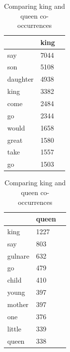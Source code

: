 \documentclass[11pt]{article}
\begin{document}
\begin{table}[H]
\centering
\begin{tabular}{@{}lll@{}}
\toprule
                    &           king        \\ \midrule
say                 &           7044        \\
son                 &           5108        \\
daughter            &           4938        \\ 
king                &           3382        \\
come                &           2484        \\
go                  &           2344        \\
would               &           1658        \\
great               &           1580        \\
take                &           1557        \\            
go                  &           1503        \\ \bottomrule
           
\end{tabular}
\hspace*{0.5cm}
\begin{tabular}{@{}lll@{}}
\toprule

                    &       queen   \\ \midrule
king                &       1227    \\
say                 &       803     \\
gulnare             &       632     \\ 
go                  &       479     \\
child               &       410     \\
young               &       397     \\
mother              &       397     \\
one                 &       376     \\
little              &       339     \\            
queen               &       338     \\ \bottomrule
\end{tabular}

\caption{Comparing king and queen co-occurrences}
\label{king/queen}
\end{table}
\end{document}
